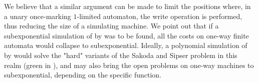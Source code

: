 We believe that a similar argument can be made to limit the positions where, in a unary once-marking $1$-limited automaton, the write operation is performed, thus reducing the size of a simulating machine.
We point out that if a subexponential simulation of \OMOLAs by \ODFAs was to be found, all the costs on one-way finite automata would collapse to subexponential.
Ideally, a polynomial simulation of \OMOLAs by \TDFAs would solve the "hard" variants of the Sakoda and Sipser problem in this realm (green in ), and may also bring the open problems on one-way machines to subexponential, depending on the specific function.
